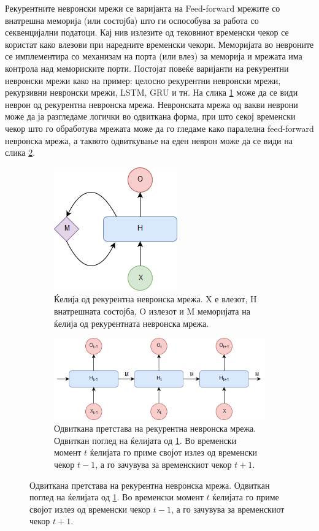 Рекурентните невронски мрежи се варијанта на Feed-forward мрежите со внатрешна меморија (или состојба) што ги оспособува за работа со секвенцијални податоци. Кај нив излезите од тековниот временски чекор се користат како влезови при наредните временски чекори. Меморијата во невроните се имплементира со механизам на порта (или влез) за меморија и мрежата има контрола над мемориските порти. Постојат повеќе варијанти на рекурентни невронски мрежи како на пример: целосно рекурентни невронски мрежи, рекурзивни невронски мрежи, LSTM, GRU и тн. На слика \ref{fig:rnn_folded} може да се види неврон од рекурентна невронска мрежа. Невронската мрежа од вакви неврони може да ја разгледаме логички во одвиткана форма, при што секој временски чекор што го обработува мрежата може да го гледаме како паралелна feed-forward невронска мрежа, а таквото одвиткување на еден неврон може да се види на слика \ref{fig:rnn_unfolded}.

\begin{figure}[H]
	\centering
	\caption{Рекурентна невронска мрежа.}
    \begin{subfigure}[t]{1\linewidth} 
        \centering\includegraphics[width=.3\linewidth]{images/rnn_folded.png}
        \caption{Ќелија од рекурентна невронска мрежа. X е влезот, H внатрешната состојба, O излезот и M меморијата на ќелија од рекурентната невронска мрежа.}	
        \label{fig:rnn_folded}
    \end{subfigure}
    \begin{subfigure}[t]{1\linewidth}       
        \centering\includegraphics[width=.7\linewidth]{images/rnn_unfolded.png}
        \caption{Одвиткана претстава на рекурентна невронска мрежа. Одвиткан поглед на ќелијата од \ref{fig:rnn_folded}. Во временски момент $t$ ќелијата го приме својот излез од временски чекор $t-1$, а го зачувува за временскиот чекор $t+1$.}
        \label{fig:rnn_unfolded}
    \end{subfigure}
	\label{fig:rnn}
\end{figure}

